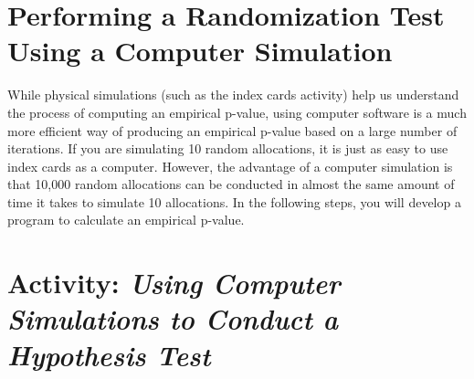 \documentclass[
]{report}
\begin{document}
\section{\texorpdfstring{\textbf{Performing a Randomization Test Using a Computer Simulation}}{Performing a Randomization Test Using a Computer Simulation}}\label{performing-a-randomization-test-using-a-computer-simulation}

\normalsize

While physical simulations (such as the index cards activity) help us understand the process of computing an
empirical p-value, using computer software is a much more efficient way of producing an empirical p-value
based on a large number of iterations. If you are simulating 10 random allocations, it is just as easy to use index cards as a computer. However, the advantage of a computer simulation is that 10,000 random allocations
can be conducted in almost the same amount of time it takes to simulate 10 allocations. In the following
steps, you will develop a program to calculate an empirical p-value.

\section*{\texorpdfstring{Activity: \emph{Using Computer Simulations to Conduct a Hypothesis Test}}{Activity: Using Computer Simulations to Conduct a Hypothesis Test}}\label{activity-using-computer-simulations-to-conduct-a-hypothesis-test}
\end{document}
